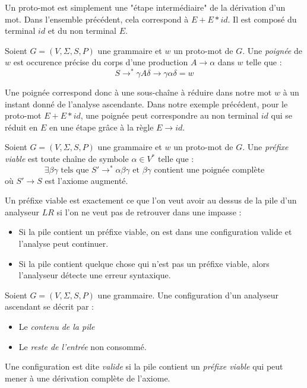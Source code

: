 Un proto-mot est simplement une "étape intermédiaire" de la dérivation d'un mot. Dans 
l'ensemble précédent, cela correspond à $ E + E * id$. Il est composé du terminal $id$ et 
du non terminal $E$. 

\begin{definition}
    Soient $G = (V, \Sigma, S, P)$ une grammaire et $w$ un proto-mot de $G$. 
    Une \emph{poignée} de $w$ est occurence précise du corps d'une production $A \to \alpha$ dans 
    $w$ telle que : 
        \[ S \to^* \gamma A \delta \to \gamma \alpha \delta = w \]
\end{definition}

Une poignée correspond donc à une sous-chaîne à réduire dans notre mot $w$ à un instant donné de l'analyse ascendante. 
Dans notre exemple précédent, pour le proto-mot $ E + E * id$, une poignée peut correspondre au non terminal 
$id$ qui se réduit en $E$ en une étape grâce à la règle $ E \to id$. 

\begin{definition}
    Soient $G = (V, \Sigma, S, P)$ une grammaire et $w$ un proto-mot de $G$. 
    Une \emph{préfixe viable} est toute chaîne de symbole $ \alpha\in V^*$ telle que : 
        \[ \exists \beta \gamma \text{  tels que  }  S' \to^* \alpha \beta \gamma \text{ et } \beta \gamma \text{ contient une poignée complète} \] 
    où $S' \to S$ est l'axiome augmenté.   
\end{definition}

Un préfixe viable est exactement ce que l'on veut avoir au dessus de la pile d'un analyseur $LR$ si l'on ne veut 
pas de retrouver dans une impasse : 
\begin{itemize}
    \item Si la pile contient un préfixe viable, on est dans une configuration valide et l’analyse peut continuer.
    \item Si la pile contient quelque chose qui n’est pas un préfixe viable, alors l’analyseur détecte une erreur syntaxique.
\end{itemize}

\begin{definition}
    Soient $G = (V, \Sigma, S, P)$ une grammaire. Une configuration d'un analyseur ascendant se décrit par : 
    \begin{itemize}
        \item Le \emph{contenu de la pile}
        \item Le \emph{reste de l'entrée} non consommé. 
    \end{itemize}
    Une configuration est dite \emph{valide} si la pile contient un \emph{préfixe viable} qui peut mener à 
    une dérivation complète de l'axiome. 
\end{definition}


